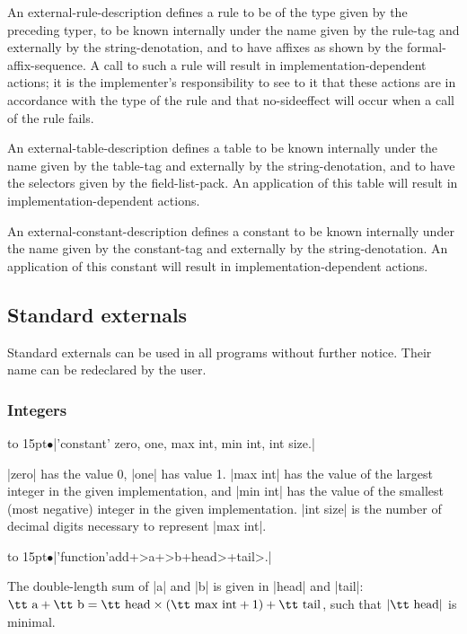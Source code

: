 \documentclass{article}
\newcommand\g[1]{{\sf #1}}
\begin{document}
An \g{external-rule-description} defines a rule to be of the type given by
the preceding \g{typer}, to be known internally under the name given by the
\g{rule-tag} and externally by the \g{string-denotation}, and to have affixes as
shown by the \g{formal-affix-sequence}. A call to such a rule will result in
implementation-dependent actions; it is the implementer's responsibility to
see to it that these actions are in accordance with the type of the rule and
that no-sideeffect will occur when a call of the rule fails.

An \g{external-table-description} defines a table to be known internally
under the name given by the \g{table-tag} and externally by the
 \g{string-denotation}, and to have the selectors given by the
\g{field-list-pack}. An
application of this table will result in implementation-dependent actions.

An \g{external-constant-description} defines a constant to be known
internally under the name given by the \g{constant-tag} and externally by the
\g{string-denotation}. An application of this constant will result in
implementation-dependent actions.

\subsection{Standard externals}\label{5.2}

Standard externals can be used in all programs without further notice. Their
name can be redeclared by the user.

\subsubsection{Integers}\label{5.2.1}


\newcommand\X{\smallskip\noindent\hbox to 15pt{\hss$\bullet$}\space}
\newcommand\Y{\par\hangindent=15pt\hangafter=0\noindent}


\X\pp|'constant' zero, one, max int, min int, int size.|\Y
\pp|zero| has the value 0, \pp|one| has value 1. \pp|max int| has the value
of the largest integer in the given implementation, and \pp|min int| has the
value of the smallest (most negative) integer in the given implementation.
\pp|int size| is the number of decimal digits necessary to represent
\pp|max int|.

\X\pp|'function'add+>a+>b+head>+tail>.|\Y
The double-length sum of \pp|a| and \pp|b| is given in \pp|head| and
\pp|tail|: $\mbox{\tt a}+\mbox{\tt b}=\mbox{\tt head}\times(\mbox{\tt max int}
+1)+\mbox{\tt tail}$, such that $|\mbox{\tt head}|$ is minimal.
\end{document}
